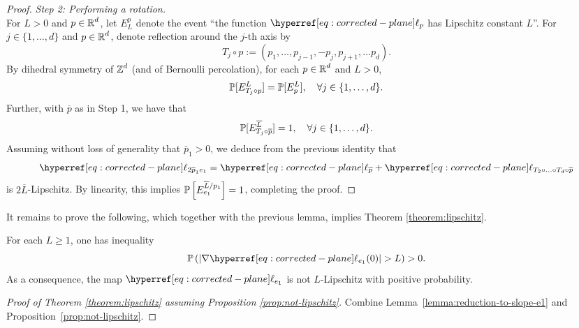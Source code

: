 \documentclass[12pt]{amsart}
\numberwithin{equation}{section}
\begin{document}
\begin{proof}
		{\it Step 2: Performing a rotation.} \\ 
		For $L > 0$ and $p \in \R^d$, let $E_L^p$ denote the event  ``the function $\ellp{p}$ has Lipschitz constant $L$''.
		For $j \in \{1, \ldots, d\}$ and $p \in \R^d$, denote reflection around the $j$-th axis by 
		\[
		T_j \circ p := (p_1, \ldots, p_{j-1}, -p_j, p_{j+1}, \ldots p_d).
		\]
		By dihedral symmetry of $\Z^d$ (and of Bernoulli percolation), for each $p \in \R^d$ and $L > 0$, 
		\[
		\P[E_{T_j \circ p}^L] = \P[E_p^L], \quad \forall j \in \{1, \ldots, d\}.
		\]
		Further, with $\overline p$ as in Step 1, we have that 
		\[
		\P[E_{T_j \circ \overline p}^{\overline{L}}] = 1, \quad \forall j \in \{1, \ldots, d\}.
		\]
		Assuming without loss of generality that $\bar p_1 >0 $, we deduce from the previous identity that 
		\[
		\ellp{2\overline{p}_1 e_1} = \ellp{\overline{p}} + \ellp{T_2 \circ \ldots \circ T_d \circ \overline{p}}
		\]
		is $2 \overline{L}$-Lipschitz. By linearity, this implies $\P\left[E_{e_1}^{ \overline{L}/p_1}\right] = 1$, completing the proof.
	\end{proof}
	
	
	It remains to prove the following, which together with the previous lemma, implies Theorem \ref{theorem:lipschitz}.
	\begin{prop} \label{prop:not-lipschitz}
		For each $L \geq 1$, one has inequality
		\begin{equation*}
			\P \left( \left| \nabla \ellp{e_1}(0) \right|  > L \right) > 0.
		\end{equation*}
		As a consequence, the map $\ellp{e_1}$ is not $L$-Lipschitz with positive probability. 
	\end{prop}
	\begin{proof}[Proof of Theorem \ref{theorem:lipschitz} assuming Proposition \ref{prop:not-lipschitz}]
		Combine Lemma~\ref{lemma:reduction-to-slope-e1} and Proposition~\ref{prop:not-lipschitz}. 
	\end{proof}
	
\end{document}
